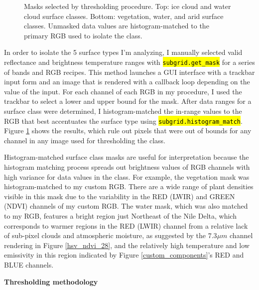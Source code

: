 \documentclass[12pt]{article}
\newcommand{\hltexttt}[1]{\texttt{\hl{#1}}}
\begin{document}
\begin{figure}[h!]
    \caption{Masks selected by thresholding procedure. Top: ice cloud and water cloud surface classes. Bottom: vegetation, water, and arid surface classes. Unmasked data values are histogram-matched to the primary RGB used to isolate the class.}
    \label{thresh_masks}
\end{figure}

In order to isolate the 5 surface types I'm analyzing, I manually selected valid reflectance and brightness temperature ranges with \hltexttt{subgrid.get\_mask} for a series of bands and RGB recipes. This method launches a GUI interface with a trackbar input form and an image that is rendered with a callback loop depending on the value of the input. For each channel of each RGB in my procedure, I used the trackbar to select a lower and upper bound for the mask. After data ranges for a surface class were determined, I histogram-matched the in-range values to the RGB that best accentuates the surface type using \hltexttt{subgrid.histogram\_match}. Figure \ref{thresh_masks} shows the results, which rule out pixels that were out of bounds for any channel in any image used for thresholding the class.

Histogram-matched surface class masks are useful for interpretation because the histogram matching process spreads out brightness values of RGB channels with high variance for data values in the class. For example, the vegetation mask was histogram-matched to my custom RGB. There are a wide range of plant densities visible in this mask due to the variability in the RED (LWIR) and GREEN (NDVI) channels of my custom RGB. The water mask, which was also matched to my RGB, features a bright region just Northeast of the Nile Delta, which corresponds to warmer regions in the RED (LWIR) channel from a relative lack of sub-pixel clouds and atmospheric moisture, as suggested by the $7.3\mu m$ channel rendering in Figure \ref{hsv_ndvi_28}, and the relatively high temperature and low emissivity in this region indicated by Figure \ref{custom_components}'s RED and BLUE channels.

\clearpage

\noindent
\textbf{Thresholding methodology}
\end{document}
